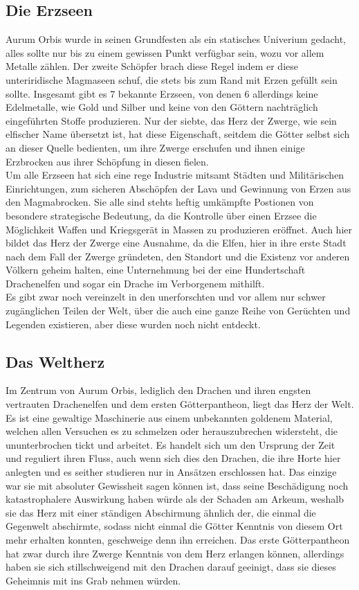 \documentclass[a4paper,12pt,oneside]{book}
\begin{document}
\subsection{Die Erzseen}
Aurum Orbis wurde in seinen Grundfesten als ein statisches Univerium gedacht, alles sollte nur bis zu einem gewissen Punkt verfügbar sein, wozu vor allem Metalle zählen. Der zweite Schöpfer brach diese Regel indem er diese unteriridische Magmaseen schuf, die stets bis zum Rand mit Erzen gefüllt sein sollte. Insgesamt gibt es 7 bekannte Erzseen, von denen 6 allerdings keine Edelmetalle, wie Gold und Silber und keine von den Göttern nachträglich eingeführten Stoffe produzieren. Nur der siebte, das Herz der Zwerge, wie sein elfischer Name übersetzt ist, hat diese Eigenschaft, seitdem die Götter selbst sich an dieser Quelle bedienten, um ihre Zwerge erschufen und ihnen einige Erzbrocken aus ihrer Schöpfung in diesen fielen. \\Um alle Erzseen hat sich eine rege Industrie mitsamt Städten und Militärischen Einrichtungen, zum sicheren Abschöpfen der Lava und Gewinnung von Erzen aus den Magmabrocken. Sie alle sind stehts heftig umkämpfte Postionen von besondere strategische Bedeutung, da die Kontrolle über einen Erzsee die Möglichkeit Waffen und Kriegsgerät in Massen zu produzieren eröffnet. Auch hier bildet das Herz der Zwerge eine Ausnahme, da die Elfen, hier in ihre erste Stadt nach dem Fall der Zwerge gründeten, den Standort und die Existenz vor anderen Völkern geheim halten, eine Unternehmung bei der eine Hundertschaft Drachenelfen und sogar ein Drache im Verborgenem mithilft.
\\Es gibt zwar noch vereinzelt in den unerforschten und vor allem nur schwer zugänglichen Teilen der Welt, über die auch eine ganze Reihe von Gerüchten und Legenden existieren, aber diese wurden noch nicht entdeckt.

\subsection{Das Weltherz}
Im Zentrum von Aurum Orbis, lediglich den Drachen und ihren engsten vertrauten Drachenelfen und dem ersten Götterpantheon, liegt das Herz der Welt. Es ist eine gewaltige Maschinerie aus einem unbekannten goldenem Material, welchen allen Versuchen es zu schmelzen oder herauszubrechen widersteht, die ununterbrochen tickt und arbeitet. Es handelt sich um den Ursprung der Zeit und reguliert ihren Fluss, auch wenn sich dies den Drachen, die ihre Horte hier anlegten und es seither studieren nur in Ansätzen erschlossen hat. Das einzige war sie mit absoluter Gewissheit sagen können ist, dass seine Beschädigung noch katastrophalere Auswirkung haben würde als der Schaden am Arkeum, weshalb sie das Herz mit einer ständigen Abschirmung ähnlich der, die einmal die Gegenwelt abschirmte, sodass nicht einmal die Götter Kenntnis von diesem Ort mehr erhalten konnten, geschweige denn ihn erreichen. Das erste Götterpantheon hat zwar durch ihre Zwerge Kenntnis von dem Herz erlangen können, allerdings haben sie sich stillschweigend mit den Drachen darauf geeinigt, dass sie dieses Geheimnis mit ins Grab nehmen würden.
\end{document}
